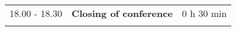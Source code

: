 \begin{longtable}{p{3cm}p{10cm}p{4cm}}
\vspace{1cm}
18.00 - 18.30 & {\bf Closing of conference} & \hfill 0 h 30 min\\ 
\vspace{1cm}
\end{longtable}


